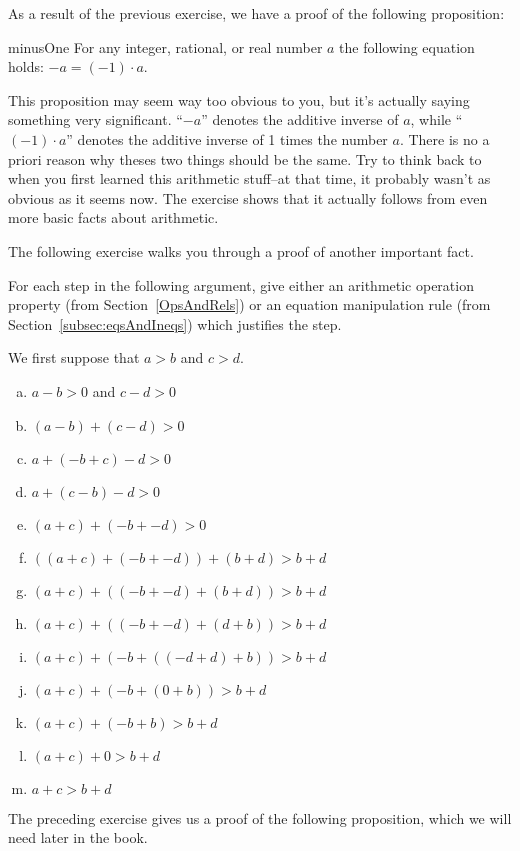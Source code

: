 As a result of the previous exercise, we have a proof of the following proposition:

\begin{prop}{minusOne}
For any integer, rational, or real number $a$ the following equation holds: $ -a =  (-1) \cdot a $. 
\end{prop}
This proposition may seem way too obvious to you, but it's actually saying something very significant. ``$-a$'' denotes the additive inverse of $a$, while ``$(-1) \cdot a$'' denotes the additive inverse of 1 times the number $a$. There is no a priori reason why theses two things should be the same. Try to think back to when you first learned this arithmetic stuff--at that time, it probably wasn't as obvious as it seems now. The exercise shows that it actually follows from even more basic facts about arithmetic.


The following exercise walks you through a proof of another important fact.

\begin{exercise}{}
For each step in the following argument, give either an arithmetic operation property (from Section~\ref{OpsAndRels}) or an equation manipulation rule (from Section~\ref{subsec:eqsAndIneqs}) which justifies the step.

\noindent
We first suppose that $a>b$ and $c>d$. 
\begin{enumerate}[(a)]
\item
$a-b>0$ and $c-d>0$
\item
$(a-b) + (c-d) > 0$
\item
$a + (-b+c) - d > 0$
\item
$a + (c-b) - d > 0$
\item
$(a+c) + (-b + -d) > 0$
\item
$((a+c) + (-b + -d)) + (b+d) > b+d$
\item
$(a+c) + ((-b + -d) + (b+d)) > b+d$
\item
$(a+c) + ((-b + -d) + (d+b)) > b+d$
\item
$(a+c) + (-b + ((-d + d) +b)) > b+d$
\item
$(a+c) + (-b + (0 +b)) > b+d$
\item
$(a+c) + (-b + b) > b+d$
\item
$(a+c)  + 0 > b+d$
\item
$a+c > b+d$
\end{enumerate}
\end{exercise}

The preceding exercise gives us a proof of the following proposition, which we will need later in the book.

